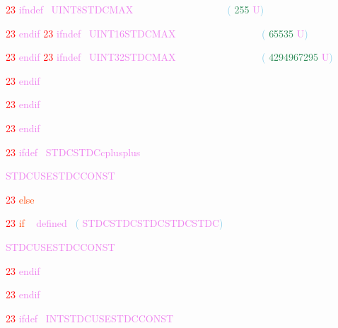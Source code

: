 \documentclass[8, usernames, dvipsnames]{beamer}
\begin{document}
\begin{frame}
 \textcolor{Red}{23}
\textcolor{Violet}{ifndef}\textcolor{White}{\ }
\textcolor{Violet}{UINT8STDCMAX}
 \textcolor{White}{\ }
\textcolor{White}{\ }
\textcolor{White}{\ }
\textcolor{White}{\ }
\textcolor{White}{\ }
\textcolor{White}{\ }
\textcolor{White}{\ }
\textcolor{White}{\ }
\textcolor{White}{\ }
\textcolor{White}{\ }
\textcolor{White}{\ }
\textcolor{SkyBlue}{(}
\textcolor{SeaGreen}{255}
\textcolor{Violet}{U}\textcolor{SkyBlue}{)}

  \textcolor{Red}{23}
\textcolor{Violet}{endif}
  \textcolor{Red}{23}
\textcolor{Violet}{ifndef}\textcolor{White}{\ }
\textcolor{Violet}{UINT16STDCMAX}
 \textcolor{White}{\ }
\textcolor{White}{\ }
\textcolor{White}{\ }
\textcolor{White}{\ }
\textcolor{White}{\ }
\textcolor{White}{\ }
\textcolor{White}{\ }
\textcolor{White}{\ }
\textcolor{White}{\ }
\textcolor{White}{\ }
\textcolor{SkyBlue}{(}
\textcolor{SeaGreen}{65535}
\textcolor{Violet}{U}\textcolor{SkyBlue}{)}

  \textcolor{Red}{23}
\textcolor{Violet}{endif}
  \textcolor{Red}{23}
\textcolor{Violet}{ifndef}\textcolor{White}{\ }
\textcolor{Violet}{UINT32STDCMAX}
 \textcolor{White}{\ }
\textcolor{White}{\ }
\textcolor{White}{\ }
\textcolor{White}{\ }
\textcolor{White}{\ }
\textcolor{White}{\ }
\textcolor{White}{\ }
\textcolor{White}{\ }
\textcolor{White}{\ }
\textcolor{White}{\ }
\textcolor{SkyBlue}{(}
\textcolor{SeaGreen}{4294967295}
\textcolor{Violet}{U}\textcolor{SkyBlue}{)}

  \textcolor{Red}{23}
\textcolor{Violet}{endif}
 
 \end{frame}
\begin{frame}
 \textcolor{Red}{23}
\textcolor{Violet}{endif}\textcolor{White}{\ }

 
  \textcolor{Red}{23}
\textcolor{Violet}{endif}\textcolor{White}{\ }

 
  \textcolor{Red}{23}
\textcolor{Violet}{ifdef}\textcolor{White}{\ }
\textcolor{Violet}{STDCSTDCcplusplus}
 
 
 \textcolor{Violet}{STDCUSESTDCCONST}
 
  \textcolor{Red}{23}
\textcolor{OrangeRed}{else}
\textcolor{White}{\   }

 \end{frame}
\begin{frame}

 
  \textcolor{Red}{23}
\textcolor{OrangeRed}{if}
\textcolor{White}{\ }
\textcolor{Violet}{defined}\textcolor{White}{\ }
\textcolor{SkyBlue}{(}
\textcolor{Violet}{STDCSTDCSTDCSTDCSTDC}\textcolor{SkyBlue}{)}

 
 \textcolor{Violet}{STDCUSESTDCCONST}
 
  \textcolor{Red}{23}
\textcolor{Violet}{endif}\textcolor{White}{\   }

  \textcolor{Red}{23}
\textcolor{Violet}{endif}\textcolor{White}{\   }

 
  \textcolor{Red}{23}
\textcolor{Violet}{ifdef}\textcolor{White}{\ }
\textcolor{Violet}{INTSTDCUSESTDCCONST}
 \end{frame}
\end{document}
